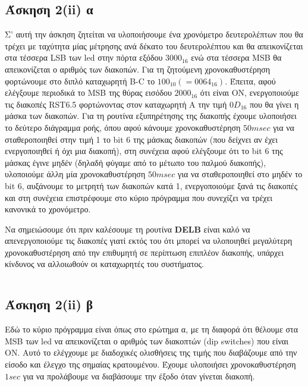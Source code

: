 \documentclass[a4paper,10pt]{article} \usepackage{anysize}
\begin{document}
\subsection*{Άσκηση 2(ii) α}
Σ' αυτή την άσκηση ζητείται να υλοποιήσουμε ένα χρονόμετρο δευτερολέπτων
που θα τρέχει με ταχύτητα μίας μέτρησης ανά δέκατο του δευτερολέπτου και θα
απεικονίζεται στα τέσσερα LSB των led στην πόρτα εξόδου $3000_{16}$ ενώ στα τέσσερα
MSB θα απεικονίζεται ο αριθμός των διακοπών. Για τη ζητούμενη χρονοκαθυστέρηση
φορτώνουμε στο διπλό  καταχωρητή B-C το $100_{10} (=0064_{16})$. Έπειτα, αφού
ελέγξουμε περιοδικά το MSB της θύρας εισόδου $2000_{16}$  ότι είναι ΟΝ,
ενεργοποιούμε τις διακοπές RST6.5 φορτώνοντας στον καταχωρητή Α την τιμή
$0D_{16}$
που θα γίνει η μάσκα των διακοπών. Για τη ρουτίνα εξυπηρέτησης της διακοπής
έχουμε υλοποιήσει το δεύτερο διάγραμμα ροής, όπου αφού κάνουμε
χρονοκαθυστέρηση $50 msec$ για να σταθεροποιηθεί στην τιμή 1 το bit 6 της μάσκας
διακοπών (που δείχνει αν έχει ενεργοποιηθεί ή όχι μια διακοπή), στη συνέχεια
αφού ελέγξουμε ότι το bit 6 της μάσκας έγινε μηδέν (δηλαδή φύγαμε από το
μέτωπο του παλμού διακοπής), υλοποιούμε άλλη μία χρονοκαθυστέρηση $50 msec$ για
να σταθεροποιηθεί στο μηδέν το bit 6, αυξάνουμε το μετρητή των διακοπών κατά
1, ενεργοποιούμε ξανά τις διακοπές και στη συνέχεια επιστρέφουμε στο κύριο
πρόγραμμα που συνεχίζει να τρέχει κανονικά το χρονόμετρο.

Να σημειώσουμε ότι πριν καλέσουμε τη ρουτίνα \textbf{DELB} είναι καλό να
απενεργοποιούμε τις διακοπές γιατί εκτός του ότι μπορεί να υλοποιηθεί
μεγαλύτερη χρονοκαθυστέρηση από την επιθυμητή σε περίπτωση επιπλέον διακοπής,
υπάρχει κίνδυνος να αλλοιωθούν οι καταχωρητές του συστήματος.
\inputminted[linenos,obeytabs,fontsize=\footnotesize]{oldasm}{../askhsh_2_ii_a.8085}
\subsection*{Άσκηση 2(ii) β}
Εδώ το κύριο πρόγραμμα είναι όπως στο ερώτημα α, με τη διαφορά ότι θέλουμε στα
MSB των led να απεικονίζεται ο αριθμός των διακοπτών (dip switches) που είναι
ON. Αυτό το ελέγχουμε με διαδοχικές ολισθήσεις της τιμής που διαβάζουμε από
την είσοδο και έλεγχο της σημαίας κρατουμένου. Έχουμε υλοποιήσει
χρονοκαθυστέρηση $1sec$ για να προλάβουμε να διαβάσουμε την έξοδο όταν γίνεται
διακοπή. 
\inputminted[linenos,obeytabs,fontsize=\footnotesize]{oldasm}{../askhsh_2_ii_b.8085}
\end{document}
